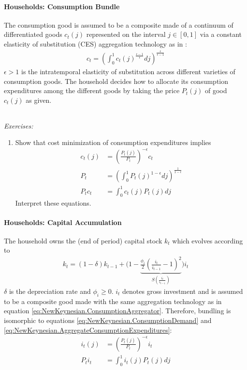 \paragraph{Households: Consumption Bundle}
The consumption good is assumed to be a composite made of a continuum of differentiated goods $c_t(j)$
  represented on the interval $j\in [0,1]$ via a constant elasticity of substitution (CES) aggregation technology as in \textcite{Dixit.Stiglitz_1977_MonopolisticCompetitionOptimum}:
\begin{align}
	c_t = \left(\int_0^1 c_t(j)^{\frac{\epsilon-1}{\epsilon}} dj \right)^{\frac{\epsilon}{\epsilon-1}} \label{eq:NewKeynesian.ConsumptionAggregator}
\end{align}
$\epsilon>1$ is the intratemporal elasticity of substitution across different varieties of consumption goods.
The household decides how to allocate its consumption expenditures among the different goods by taking the price $P_t(j)$ of good $c_t(j)$ as given.

~\\\noindent\emph{Exercises:}
\begin{enumerate}[resume]
\item Show that cost minimization of consumption expenditures implies
\begin{align}
c_t(j) &= \left(\frac{P_t(j)}{P_t}\right)^{-\epsilon} c_t \label{eq:NewKeynesian.ConsumptionDemand}
\\
P_t &= \left(\int_0^1 P_t(j)^{1-\epsilon}dj\right)^{\frac{1}{1-\epsilon}} \label{eq:NewKeynesian.AggregatePriceIndex}
\\
P_t c_t &= \int_0^1 c_t(j) P_t(j) dj \label{eq:NewKeynesian.AggregateConsumptionExpenditures}
\end{align}
Interpret these equations.
\end{enumerate} 

\paragraph{Households: Capital Accumulation}
The household owns the (end of period) capital stock $k_t$ which evolves according to
\begin{align}
k_t = (1-\delta)k_{t-1} + \Biggl( 1 - \underbrace{\frac{\phi_i}{2} \left(\frac{i_t}{i_{t-1}} - 1 \right)^2}_{S\left(\frac{i_t}{i_{t-1}}\right)} \Biggr) i_t \label{eq:NewKeynesian.CapitalAccumulation}
\end{align}
$\delta$ is the depreciation rate and $\phi_i \geq 0$.
$i_t$ denotes gross investment and is assumed to be a composite good made with the same aggregation technology as in equation \eqref{eq:NewKeynesian.ConsumptionAggregator}.
Therefore, bundling is isomorphic to equations \eqref{eq:NewKeynesian.ConsumptionDemand} and \eqref{eq:NewKeynesian.AggregateConsumptionExpenditures}:
\begin{align}
i_t(j) &= \left(\frac{P_t(j)}{P_t}\right)^{-\epsilon} i_t \label{eq:NewKeynesian.InvestmentDemand}
\\
P_t i_t &= \int_0^1 i_t(j) P_t(j) dj \label{eq:NewKeynesian.AggregateInvestmentExpenditures}
\end{align}

